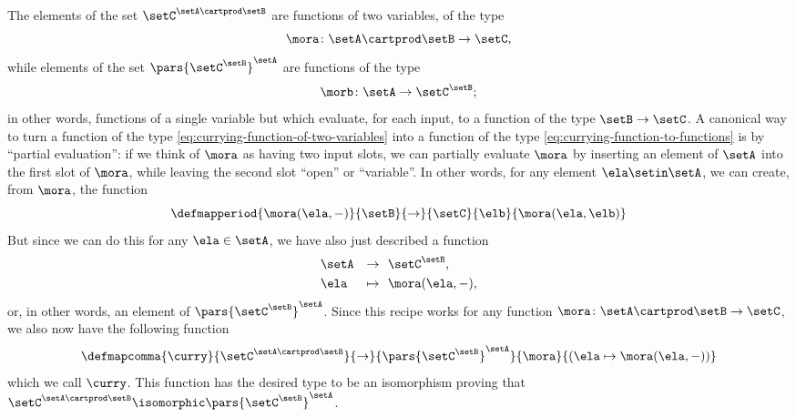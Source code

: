 The elements of the set $ \setC^{\setA \cartprod \setB}$ are functions of two variables, of the type
\begin{equation}\label{eq:currying-function-of-two-variables}
\mora \colon \setA \cartprod \setB \to \setC, 
\end{equation}
while elements of the set $\pars{\setC^\setB}^\setA$ are functions of the type
\begin{equation} \label{eq:currying-function-to-functions}
\morb \colon \setA \to \setC^\setB;
\end{equation}
in other words, functions of a single variable but which evaluate, for each input, to a function of the type $\setB \to \setC$. A canonical way to turn a function of the type \cref{eq:currying-function-of-two-variables} into a function of the type \cref{eq:currying-function-to-functions} is by ``partial evaluation'': if we think of $\mora$ as having two input slots, we can partially evaluate $\mora$ by inserting an element of $\setA$ into the first slot of $\mora$, while leaving the second slot ``open'' or ``variable''. In other words, for any element $\ela \setin \setA$, we can create, from $\mora$, the function 
\begin{equation}
 \defmapperiod{
           \mora(\ela, -)
        }{
            \setB 
        }{
            \to
        }{
           \setC 
        }{
            \elb
        }{
            \mora (\ela, \elb)
        }
\end{equation}
But since we can do this for any $\ela \in \setA$, we have also just described a function
\begin{equation}
\begin{aligned}
          & \setA & \to & \ \ \setC^\setB, \\
         & \ela & \mapsto & \ \  \mora ( \ela, -),
\end{aligned}
\end{equation}
or, in other words, an element of $\pars{\setC^\setB}^\setA$. Since this recipe works for any function $\mora \colon \setA \cartprod \setB \to \setC$, we also now have the following function
\begin{equation}
\defmapcomma{
         \curry
        }{
           \setC^{\setA \cartprod \setB}
        }{
           \to
        }{
           \pars{\setC^\setB}^\setA 
        }{
           \mora
        }{
           (\ela \mapsto \mora ( \ela, -))
           }
\end{equation}
which we call $\curry$. This function has the desired type to be an isomorphism proving that $\setC^{\setA \cartprod \setB}  \isomorphic \pars{\setC^\setB}^\setA$.

